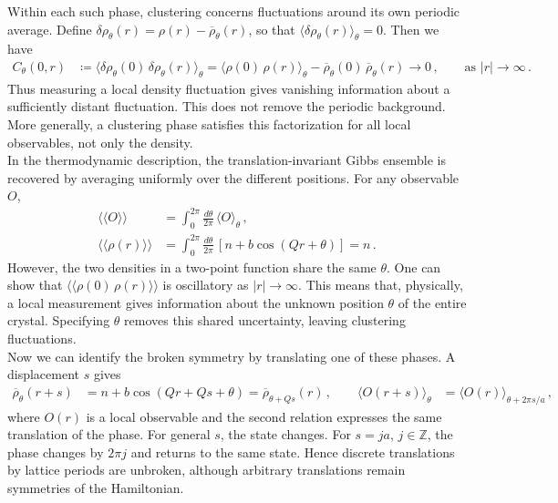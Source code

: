 \documentclass[11pt, oneside]{book}
\theoremstyle{break}
\theoremstyle{break}
\newcommand{\Z}{\mathbb{Z}}
\begin{document}
Within each such phase, clustering concerns fluctuations around its own periodic average. Define $\delta\rho_\theta(r)=\rho(r)-\overline{\rho}_\theta(r)$, so that $\langle\delta\rho_\theta(r)\rangle_\theta=0$. Then we have
\begin{align*}
C_\theta(0,r)&\coloneqq\langle\delta\rho_\theta(0)\,\delta\rho_\theta(r)\rangle_\theta =\langle\rho(0)\,\rho(r)\rangle_\theta
-\overline{\rho}_\theta(0)\,\overline{\rho}_\theta(r)
\longrightarrow 0\,,\qquad \text{as }|r|\to\infty\,.
\end{align*}
Thus measuring a local density fluctuation gives vanishing information about a sufficiently distant fluctuation. This does not remove the periodic background. More generally, a clustering phase satisfies this factorization for all local observables, not only the density.\\

In the thermodynamic description, the translation-invariant Gibbs ensemble is recovered by averaging uniformly over the different positions. For any observable $O$,
\begin{align*}
\langle\langle O\rangle\rangle
&=\int_0^{2\pi}\frac{d\theta}{2\pi}\,\langle O\rangle_\theta\,,\\
\langle\langle\rho(r)\rangle\rangle
&=\int_0^{2\pi}\frac{d\theta}{2\pi}\,[n+b\cos(Qr+\theta)]=n\,.
\end{align*}
However, the two densities in a two-point function share the same $\theta$. One can show that $\langle\langle\rho(0)\,\rho(r)\rangle\rangle$ is oscillatory as $|r|\to \infty$. This means that, physically, a local measurement gives information about the unknown position $\theta$ of the entire crystal. Specifying $\theta$ removes this shared uncertainty, leaving clustering fluctuations.\\

Now we can identify the broken symmetry by translating one of these phases. A displacement $s$ gives
\begin{align*}
\overline{\rho}_\theta(r+s)
&=n+b\cos(Qr+Qs+\theta)=\overline{\rho}_{\theta+Qs}(r)\,,\qquad
\langle O(r+s)\rangle_\theta
&=\langle O(r)\rangle_{\theta+2\pi s/a}\,,
\end{align*}
where $O(r)$ is a local observable and the second relation expresses the same translation of the phase. For general $s$, the state changes. For $s=ja$, $j\in\Z$, the phase changes by $2\pi j$ and returns to the same state. Hence discrete translations by lattice periods are unbroken, although arbitrary translations remain symmetries of the Hamiltonian.\\
\end{document}
